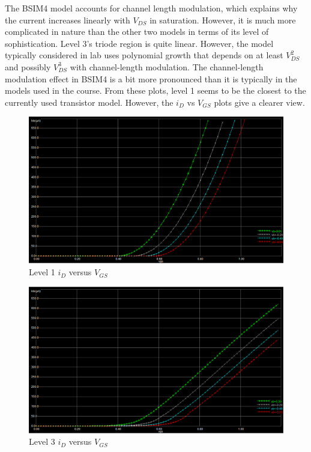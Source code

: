 \FloatBarrier

The BSIM4 model accounts for channel length modulation, which explains why the current increases linearly with $V_{DS}$ in saturation.
However, it is much more complicated in nature than the other two models in terms of its level of sophistication.
Level 3's triode region is quite linear. However, the model typically considered in lab uses polynomial growth that depends on at least $V_{DS}^2$ and possibly $V_{DS}^3$ with channel-length modulation.
The channel-length modulation effect in BSIM4 is a bit more pronounced than it is typically in the models used in the course.
From these plots, level 1 seems to be the closest to the currently used transistor model.
However, the $i_{D}$ vs $V_{GS}$ plots give a clearer view.

\FloatBarrier

\begin{figure}[h!]
	\centering
	\includegraphics[scale=0.50]{./images/id_vgs_level1.PNG}
	\caption{Level 1 $i_{D}$ versus $V_{GS}$}
	\label{fig:id_vgs_level1}
\end{figure}

\FloatBarrier

\FloatBarrier

\begin{figure}[h!]
	\centering
	\includegraphics[scale=0.50]{./images/id_vgs_level3.PNG}
	\caption{Level 3 $i_{D}$ versus $V_{GS}$}
	\label{fig:id_vgs_level3}
\end{figure}

